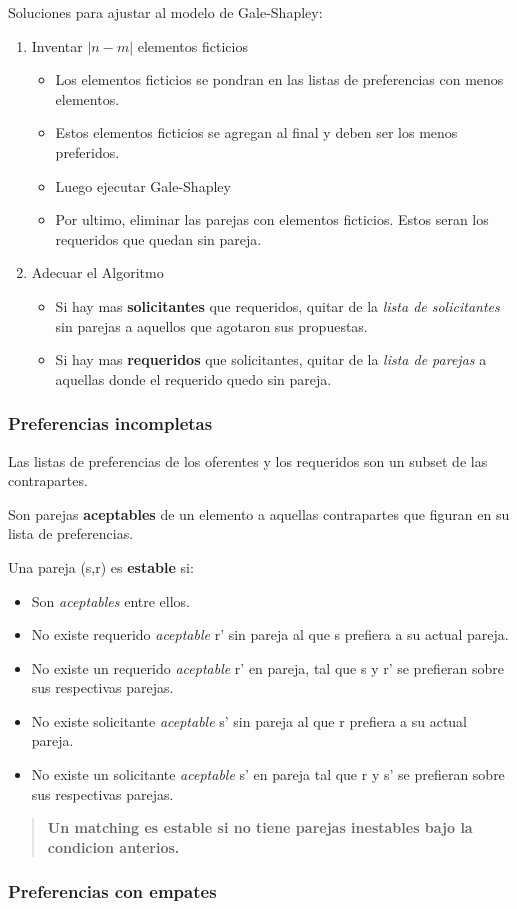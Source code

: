 \documentclass{article}
\begin{document}
Soluciones para ajustar al modelo de Gale-Shapley:
\begin{enumerate}
    \item Inventar \(|n-m|\) elementos ficticios
    \begin{itemize}
        \item Los elementos ficticios se pondran en las listas de preferencias con menos elementos.
        \item Estos elementos ficticios se agregan al final y deben ser los menos preferidos.
        \item Luego ejecutar Gale-Shapley
        \item Por ultimo, eliminar las parejas con elementos ficticios. Estos seran los requeridos que quedan sin pareja.
    \end{itemize}
    \item Adecuar el Algoritmo
    \begin{itemize}
        \item Si hay mas \textbf{solicitantes} que requeridos, quitar de la \textit{lista de solicitantes} sin parejas a aquellos que agotaron sus propuestas.
        \item Si hay mas \textbf{requeridos} que solicitantes, quitar de la \textit{lista de parejas} a aquellas donde el requerido quedo sin pareja.
    \end{itemize}
\end{enumerate}


\subsubsection{Preferencias incompletas}
Las listas de preferencias de los oferentes y los requeridos son un subset de las contrapartes.

Son parejas \textbf{aceptables} de un elemento a aquellas contrapartes que figuran en su lista de preferencias.

Una pareja (s,r) es \textbf{estable} si:
\begin{itemize}
    \item Son \textit{aceptables} entre ellos.
    \item No existe requerido \textit{aceptable} r' sin pareja al que s prefiera a su actual pareja.
    \item No existe un requerido \textit{aceptable} r' en pareja, tal que s y r' se prefieran sobre sus respectivas parejas.
    \item No existe solicitante \textit{aceptable} s' sin pareja al que r prefiera a su actual pareja.
    \item No existe un solicitante \textit{aceptable} s' en pareja tal que r y s' se prefieran sobre sus respectivas parejas.
\end{itemize}

\begin{quote}
    \textbf{Un matching es estable si no tiene parejas inestables bajo la condicion anterios.}
\end{quote}



\subsubsection{Preferencias con empates}
\end{document}
